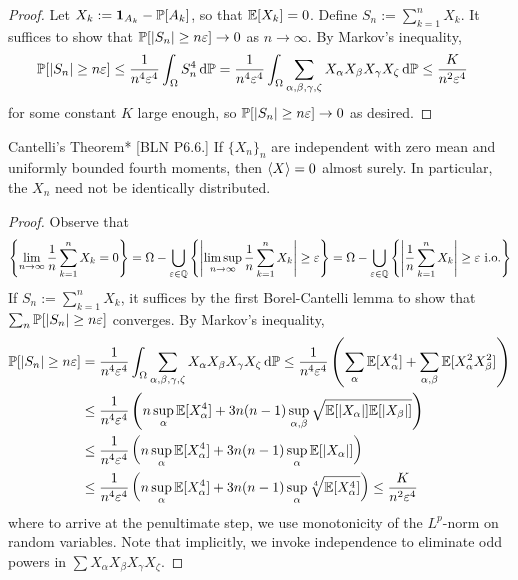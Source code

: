 \begin{proof}
    Let \(X_k := \mathbf{1}_{A_k} - \mathbb{P}[A_k]\), so that \(\mathbb{E}[X_k] = 0\). Define \(S_n := \sum_{k=1}^n X_k\). It suffices to show that \(\mathbb{P}[|S_n| \geq n \varepsilon] \to 0\) as \(n \to \infty\). By Markov's inequality, 
    \begin{align*}
        \mathbb{P}[|S_n| \geq n \varepsilon] 
        &\leq \frac{1}{n^4 \varepsilon^4} \int_{\Omega} S_n^4 \, \mathrm{d}\mathbb{P}
        = \frac{1}{n^4 \varepsilon^4} \int_\Omega \sum_{\alpha,\beta,\gamma,\zeta} X_\alpha X_\beta X_\gamma X_\zeta \, \mathrm{d}\mathbb{P}
        \leq \frac{K}{n^2 \varepsilon^4} 
    \end{align*}
    for some constant \(K\) large enough, so \(\mathbb{P}[|S_n| \geq n \varepsilon] \to 0\) as desired. 
\end{proof}


\begin{problem}{Cantelli's Theorem}*
    [BLN P6.6.] If \(\{X_n\}_n\) are independent with zero mean and uniformly bounded fourth moments, then \(\ev{X} = 0\) almost surely. In particular, the \(X_n\) need not be identically distributed. 
\end{problem}

\begin{proof}
    Observe that 
    \[
        \left\{ \lim_{n \to \infty} \frac{1}{n} \sum_{k=1}^n X_k = 0 \right\}
        = \Omega - \bigcup_{\varepsilon \in \mathbb{Q}} \left\{ \left| \limsup_{n \to \infty} \frac{1}{n} \sum_{k=1}^n X_k \right| \geq \varepsilon \right\}
        = \Omega - \bigcup_{\varepsilon \in \mathbb{Q}} \left\{ \left| \frac{1}{n} \sum_{k=1}^n X_k \right| \geq \varepsilon \text{ i.o.} \right\}
    \]
    If \(S_n := \sum_{k=1}^n X_k\), it suffices by the first Borel-Cantelli lemma to show that \(\sum_n \mathbb{P}[|S_n| \geq n \varepsilon]\) converges. By Markov's inequality, 
    \begin{align*}
        \mathbb{P}[|S_n| \geq n \varepsilon] 
        &= \frac{1}{n^4 \varepsilon^4} \int_{\Omega} \sum_{\alpha, \beta, \gamma, \zeta} X_\alpha X_\beta X_\gamma X_\zeta \, \mathrm{d}\mathbb{P} 
        \leq \frac{1}{n^4 \varepsilon^4} \left(\sum_\alpha \mathbb{E}[X_\alpha^4] + \sum_{\alpha, \beta} \mathbb{E}[X_\alpha^2 X_\beta^2] \right) \\
        &\leq \frac{1}{n^4 \varepsilon^4} \left(n \sup_\alpha \mathbb{E}[X_\alpha^4] + 3n(n-1) \sup_{\alpha, \beta} \sqrt{\mathbb{E}[|X_\alpha|] \mathbb{E}[|X_\beta|]} \right) \\
        &\leq \frac{1}{n^4 \varepsilon^4} \left(n \sup_\alpha \mathbb{E}[X_\alpha^4] + 3n(n-1) \sup_\alpha \mathbb{E}[|X_\alpha|] \right) \\
        &\leq \frac{1}{n^4 \varepsilon^4} \left(n \sup_\alpha \mathbb{E}[X_\alpha^4] + 3n(n-1) \sup_\alpha \sqrt[4]{\mathbb{E}[X_\alpha^4]} \right) 
        \leq \frac{K}{n^2 \varepsilon^4}
    \end{align*}
    where to arrive at the penultimate step, we use monotonicity of the \(L^p\)-norm on random variables. Note that implicitly, we invoke independence to eliminate odd powers in \(\sum X_\alpha X_\beta X_\gamma X_\zeta\). 
\end{proof}


